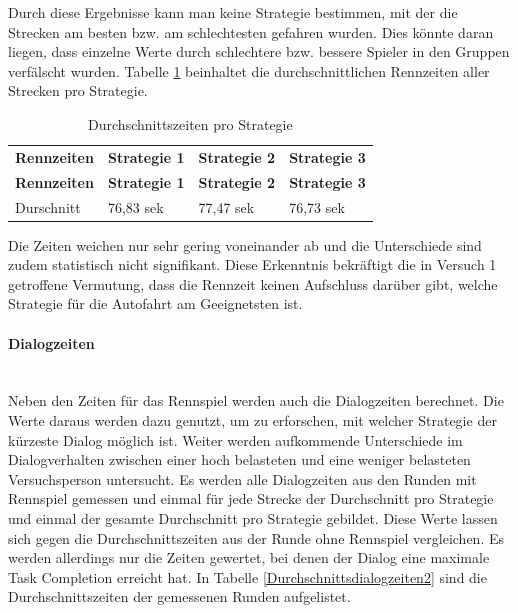 \documentclass[12pt,a4paper]{scrartcl}
\begin{document}
Durch diese Ergebnisse kann man keine Strategie bestimmen, mit der die Strecken am besten bzw. am schlechtesten gefahren wurden.
Dies könnte daran liegen, dass einzelne Werte durch schlechtere bzw. bessere Spieler in den Gruppen verfälscht wurden. Tabelle \ref{RennZeitenDis2} beinhaltet die durchschnittlichen Rennzeiten aller Strecken pro Strategie. 

\begin{longtable}{p{3cm}p{3cm}p{3cm}p{3cm} }
	\label{RennZeitenDis2}\\
	\caption[Durchschnittszeiten pro Strategie]{Durchschnittszeiten pro Strategie}\\
	\hline
	\textbf{Rennzeiten}&\textbf{Strategie 1}&\textbf{Strategie 2} &\textbf{Strategie 3}\\
	\hline
	\endfirsthead
	\hline
	\textbf{Rennzeiten}&\textbf{Strategie 1}&\textbf{Strategie 2} &\textbf{Strategie 3}\\
	\hline
	\endhead
Durschnitt & 76,83 sek & 77,47 sek & 76,73 sek \\
\hline
\end{longtable}
Die Zeiten weichen nur sehr gering voneinander ab und die Unterschiede sind zudem statistisch nicht signifikant. Diese Erkenntnis bekräftigt die in Versuch 1 getroffene Vermutung, dass die Rennzeit keinen Aufschluss darüber gibt, welche Strategie für die Autofahrt am Geeignetsten ist. 

\paragraph{Dialogzeiten}
~\\
Neben den Zeiten für das Rennspiel werden auch die Dialogzeiten berechnet. 
Die Werte daraus werden dazu genutzt, um zu erforschen, mit welcher Strategie der kürzeste Dialog möglich ist. Weiter werden aufkommende Unterschiede im Dialogverhalten zwischen einer hoch belasteten und eine weniger belasteten Versuchsperson untersucht. 
Es werden alle Dialogzeiten aus den Runden mit Rennspiel gemessen und einmal für jede Strecke der Durchschnitt pro Strategie und einmal der gesamte Durchschnitt pro Strategie gebildet. Diese Werte lassen sich gegen die Durchschnittszeiten aus der Runde ohne Rennspiel vergleichen. Es werden allerdings nur die Zeiten gewertet, bei denen der Dialog eine maximale Task Completion erreicht hat.
In Tabelle \ref{Durchschnittsdialogzeiten2} sind die Durchschnittszeiten der gemessenen Runden aufgelistet.
\end{document}

